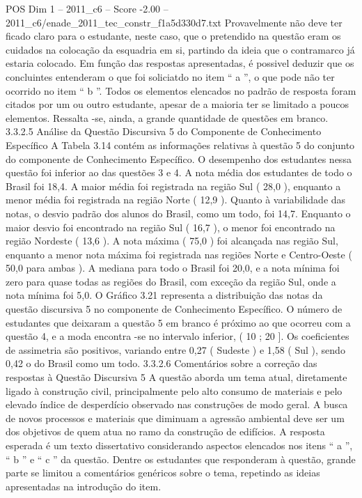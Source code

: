 \begin{textsample}{POS Dim 1 – 2011\_c6 – Score -2.00 – 2011\_c6/enade\_2011\_tec\_constr\_f1a5d330d7.txt}
Provavelmente não deve ter ficado claro para o estudante, neste caso, que o pretendido na questão eram os cuidados na colocação da esquadria em si, partindo da ideia que o contramarco já estaria colocado.
Em função das respostas apresentadas, é possivel deduzir que os concluintes entenderam o que foi soliciatdo no item “ a ”, o que pode não ter ocorrido no item “ b ”.
Todos os elementos elencados no padrão de resposta foram citados por um ou outro estudante, apesar de a maioria ter se limitado a poucos elementos.
Ressalta -se, ainda, a grande quantidade de questões em branco. 3.3.2.5 Análise da Questão Discursiva 5 do Componente de Conhecimento Específico A Tabela 3.14 contém as informações relativas à questão 5 do conjunto do componente de Conhecimento Específico.
O desempenho dos estudantes nessa questão foi inferior ao das questões 3 e 4.
A nota média dos estudantes de todo o Brasil foi 18,4.
A maior média foi registrada na região Sul ( 28,0 ), enquanto a menor média foi registrada na região Norte ( 12,9 ).
Quanto à variabilidade das notas, o desvio padrão dos alunos do Brasil, como um todo, foi 14,7.
Enquanto o maior desvio foi encontrado na região Sul ( 16,7 ), o menor foi encontrado na região Nordeste ( 13,6 ).
A nota máxima ( 75,0 ) foi alcançada nas região Sul, enquanto a menor nota máxima foi registrada nas regiões Norte e Centro-Oeste ( 50,0 para ambas ).
A mediana para todo o Brasil foi 20,0, e a nota mínima foi zero para quase todas as regiões do Brasil, com exceção da região Sul, onde a nota mínima foi 5,0.
O Gráfico 3.21 representa a distribuição das notas da questão discursiva 5 no componente de Conhecimento Específico.
O número de estudantes que deixaram a questão 5 em branco é próximo ao que ocorreu com a questão 4, e a moda encontra -se no intervalo inferior, ( 10 ; 20 ].
Os coeficientes de assimetria são positivos, variando entre 0,27 ( Sudeste ) e 1,58 ( Sul ), sendo 0,42 o do Brasil como um todo. 3.3.2.6 Comentários sobre a correção das respostas à Questão Discursiva 5 A questão aborda um tema atual, diretamente ligado à construção civil, principalmente pelo alto consumo de materiais e pelo elevado índice de desperdício observado nas construções de modo geral.
A busca de novos processos e materiais que diminuam a agressão ambiental deve ser um dos objetivos de quem atua no ramo da construção de edifícios.
A resposta esperada é um texto dissertativo considerando aspectos elencados nos itens “ a ”, “ b ” e “ c ” da questão.
Dentre os estudantes que responderam à questão, grande parte se limitou a comentários genéricos sobre o tema, repetindo as ideias apresentadas na introdução do item.

\end{textsample}
